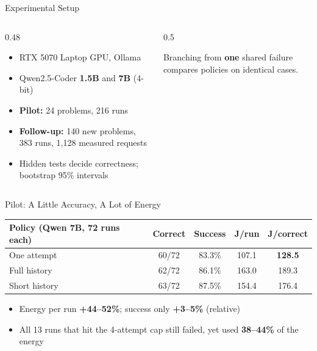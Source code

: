 \documentclass[aspectratio=169,11pt,t]{beamer}
\begin{document}
\begin{frame}{Experimental Setup}
\begin{columns}[c]
\begin{column}{0.48\textwidth}
\begin{itemize}
\item RTX 5070 Laptop GPU, Ollama
\item Qwen2.5-Coder \textbf{1.5B} and \textbf{7B} (4-bit)
\item \textbf{Pilot:} 24 problems, 216 runs
\item \textbf{Follow-up:} 140 new problems, 383 runs, 1{,}128 measured requests
\item Hidden tests decide correctness; bootstrap 95\% intervals
\end{itemize}
\end{column}
\begin{column}{0.5\textwidth}
\centering
{}
\vspace{0.4em}

\small Branching from \textbf{one} shared failure compares policies on identical cases.
\end{column}
\end{columns}
\end{frame}

\begin{frame}{Pilot: A Little Accuracy, A Lot of Energy}
\centering
\begin{tabular}{@{}lcccc@{}}
\toprule
Policy (Qwen 7B, 72 runs each) & Correct & Success & J/run & \textbf{J/correct}\\
\midrule
One attempt & 60/72 & 83.3\% & 107.1 & \textbf{128.5}\\
Full history & 62/72 & 86.1\% & 163.0 & 189.3\\
Short history & 63/72 & 87.5\% & 154.4 & 176.4\\
\bottomrule
\end{tabular}
\vspace{1em}
\begin{itemize}
\item<2-> Energy per run \textbf{+44--52\%}; success only \textbf{+3--5\%} (relative)
\item<3-> All 13 runs that hit the 4-attempt cap still failed, yet used \textbf{38--44\%} of the energy
\end{itemize}
\end{frame}
\end{document}
